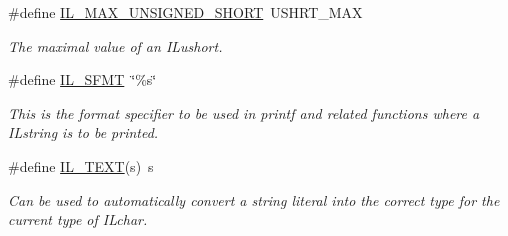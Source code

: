 \begin{DoxyCompactItemize}
\#define \hyperlink{group__il__types_ga7ba1c24cac0ceaaec1c1bebd938ce8e1}{I\+L\+\_\+\+M\+A\+X\+\_\+\+U\+N\+S\+I\+G\+N\+E\+D\+\_\+\+S\+H\+O\+R\+T}~U\+S\+H\+R\+T\+\_\+\+M\+A\+X
\begin{DoxyCompactList}\small\item\em The maximal value of an I\+Lushort. \end{DoxyCompactList}\item 
\#define \hyperlink{group__il__types_gae9770f68c5226a227b5929f4b42eec18}{I\+L\+\_\+\+S\+F\+M\+T}~\char`\"{}\%s\char`\"{}
\begin{DoxyCompactList}\small\item\em This is the format specifier to be used in {\itshape printf} and related functions where a I\+Lstring is to be printed. \end{DoxyCompactList}\item 
\#define \hyperlink{group__il__types_ga2907c2129d2ba2ebbae6aa6a69b7f685}{I\+L\+\_\+\+T\+E\+X\+T}(s)~s
\begin{DoxyCompactList}\small\item\em Can be used to automatically convert a string literal into the correct type for the current type of I\+Lchar. \end{DoxyCompactList}\end{DoxyCompactItemize}
